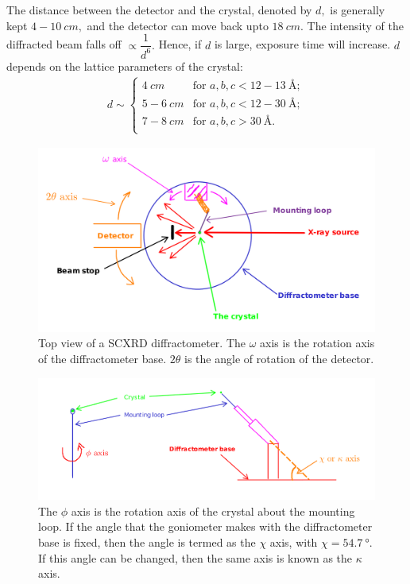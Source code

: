 The distance between the detector and the crystal, denoted by $d,$ is generally kept $4-10~\si{cm},$ and the detector can move back upto $\SI{18}{cm}.$ The intensity of the diffracted beam falls off $\propto \dfrac{1}{d^6}.$ Hence, if $d$ is large, exposure time will increase. $d$ depends on the lattice parameters of the crystal:%
%	
	\begin{subequations}
		\begin{align}
		d \sim \begin{cases}
		\SI{4}{cm} & \text{for } a, b, c < 12-13~\si{\angstrom};\\
		5-6~\si{cm} & \text{for } a, b, c < 12-30~\si{\angstrom};\\
		7-8~\si{cm} & \text{for } a, b, c > \SI{30}{\angstrom}.\\
		\end{cases}
		\end{align}
	\end{subequations}
	
\begin{figure}
	\centering
	\includegraphics[scale=0.2]{sc_diffractometer_omega.png}
	\caption{\label{diffractometer_omega}Top view of a SCXRD diffractometer. The $\omega$ axis is the rotation axis of the diffractometer base. $2\theta$ is the angle of rotation of the detector.}
\end{figure}
	
\begin{figure}
	\centering
	\includegraphics[width=\textwidth]{sc_diffractometer_phi_chi.png}
	\caption{\label{diffractometer_phi_chi}The $\phi$ axis is the rotation axis of the crystal about the mounting loop. If the angle that the goniometer makes with the diffractometer base is fixed, then the angle is termed as the $\chi$ axis, with $\chi = \SI{54.7}{\degree}.$ If this angle can be changed, then the same axis is known as the $\kappa$ axis.}
\end{figure}

